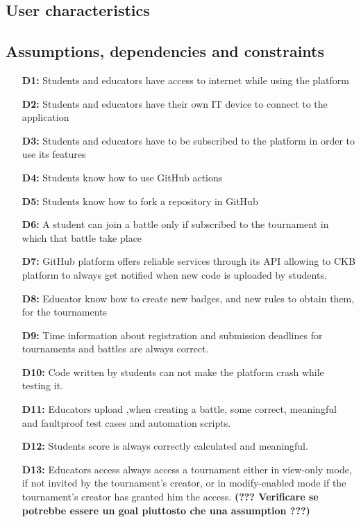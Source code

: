 \documentclass{article}
\begin{document}
{\subsection{User characteristics}
    \subsection{Assumptions, dependencies and constraints}
        \begin{itemize}
            \item[\textbf{D1:}] Students and educators have access to internet while using the platform
            \item[\textbf{D2:}] Students and educators have their own IT device to connect to the application
            \item[\textbf{D3:}] Students and educators have to be subscribed to the platform in order to use its features
            \item[\textbf{D4:}] Students know how to use GitHub actions
            \item[\textbf{D5:}] Students know how to fork a repository in GitHub
            \item[\textbf{D6:}] A student can join a battle only if subscribed to the tournament in which that battle take place
            \item[\textbf{D7:}] GitHub platform offers reliable services through its API allowing to CKB platform to always get notified when new code is uploaded by students.
            \item[\textbf{D8:}] Educator know how to create new badges, and new rules to obtain them, for the tournaments
            \item[\textbf{D9:}] Time information about registration and submission deadlines for tournaments and battles are always correct.
            \item[\textbf{D10:}] Code written by students can not make the platform crash while testing it.
            \item[\textbf{D11:}] Educators upload ,when creating a battle, some correct, meaningful and faultproof test cases and automation scripts.
            \item[\textbf{D12:}] Students score is always correctly calculated and meaningful.
            \item[\textbf{D13:}] Educators access always access a tournament either in view-only mode, if not invited by the tournament's creator, or in modify-enabled mode if the tournament's creator has granted him the access.
            \textbf{(??? Verificare se potrebbe essere un goal piuttosto che una assumption ???)}
        \end{itemize}

}
\end{document}
